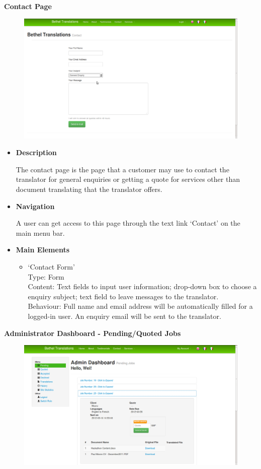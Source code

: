 \documentclass{l3proj}
\begin{document}
\textbf{Contact Page}
\begin{figure}[H]
\centering
\includegraphics[width=0.8\linewidth]{images/contactPage}
\vspace{-30pt}
\end{figure}

\begin{itemize}
\item \textbf{Description}

The contact page is the page that a customer may use to contact the translator for general enquiries or getting a quote for services other than document translating that the translator offers. 

\item \textbf{Navigation}

A user can get access to this page through the text link `Contact' on the main menu bar.

\item \textbf{Main Elements}
\begin{itemize}
\item `Contact Form'\\
Type: Form\\
Content: Text fields to input user information; drop-down box to choose a enquiry subject; text field to leave messages to the translator. \\
Behaviour: Full name and email address will be automatically filled for a logged-in user. An enquiry email will be sent to the translator. \\

\end{itemize}
\end{itemize}

\textbf{Administrator Dashboard - Pending/Quoted Jobs}
\begin{figure}[H]
\centering
\includegraphics[width=0.8\linewidth]{images/adminDashPending}
\vspace{-30pt}
\end{figure}
\end{document}
